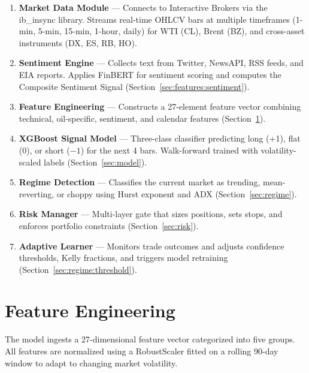 \documentclass[12pt,a4paper]{article}
\begin{document}
\begin{enumerate}[leftmargin=*]
    \item \textbf{Market Data Module} --- Connects to Interactive Brokers via the ib\_insync library. Streams real-time OHLCV bars at multiple timeframes (1-min, 5-min, 15-min, 1-hour, daily) for WTI (CL), Brent (BZ), and cross-asset instruments (DX, ES, RB, HO).

    \item \textbf{Sentiment Engine} --- Collects text from Twitter, NewsAPI, RSS feeds, and EIA reports. Applies FinBERT for sentiment scoring and computes the Composite Sentiment Signal (Section~\ref{sec:features:sentiment}).

    \item \textbf{Feature Engineering} --- Constructs a 27-element feature vector combining technical, oil-specific, sentiment, and calendar features (Section~\ref{sec:features}).

    \item \textbf{XGBoost Signal Model} --- Three-class classifier predicting long (+1), flat (0), or short ($-1$) for the next 4 bars. Walk-forward trained with volatility-scaled labels (Section~\ref{sec:model}).

    \item \textbf{Regime Detection} --- Classifies the current market as trending, mean-reverting, or choppy using Hurst exponent and ADX (Section~\ref{sec:regime}).

    \item \textbf{Risk Manager} --- Multi-layer gate that sizes positions, sets stops, and enforces portfolio constraints (Section~\ref{sec:risk}).

    \item \textbf{Adaptive Learner} --- Monitors trade outcomes and adjusts confidence thresholds, Kelly fractions, and triggers model retraining (Section~\ref{sec:regime:threshold}).
\end{enumerate}

\section{Feature Engineering}
\label{sec:features}

The model ingests a 27-dimensional feature vector categorized into five groups. All features are normalized using a RobustScaler fitted on a rolling 90-day window to adapt to changing market volatility.
\end{document}
